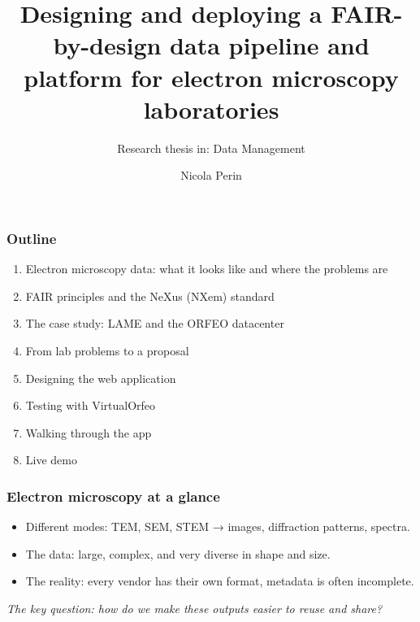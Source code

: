 \documentclass{beamer}
\title[FAIR-by-design EM pipeline]{Designing and deploying a FAIR-by-design data pipeline and platform for electron microscopy laboratories}
\subtitle{Research thesis in: Data Management}
\institute{University of Trieste}
\author[Nicola Perin]{Nicola Perin}
\begin{document}
	
	
	\begin{frame}
		\setTitlestyleDissertation
		\maketitle
	\end{frame}
	
	\begin{frame}
		\frametitle{Outline}
		\begin{enumerate}
			\item Electron microscopy data: what it looks like and where the problems are
			\item FAIR principles and the NeXus (NXem) standard
			\item The case study: LAME and the ORFEO datacenter
			\item From lab problems to a proposal
			\item Designing the web application
			\item Testing with VirtualOrfeo
			\item Walking through the app
			\item Live demo
		\end{enumerate}
	\end{frame}
	
	
	
	\begin{frame}
		\frametitle{Electron microscopy at a glance}
		\begin{itemize}
			\item Different modes: TEM, SEM, STEM → images, diffraction patterns, spectra.
			\item The data: large, complex, and very diverse in shape and size.
			\item The reality: every vendor has their own format, metadata is often incomplete.
		\end{itemize}
		\vspace{0.5em}
		\small\textit{The key question: how do we make these outputs easier to reuse and share?}
	\end{frame}
	
\end{document}
